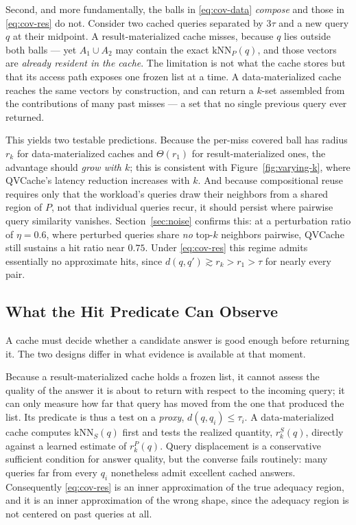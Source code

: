 Second, and more fundamentally, the balls in \eqref{eq:cov-data}
\emph{compose} and those in \eqref{eq:cov-res} do not. Consider two
cached queries separated by $3\tau$ and a new query $q$ at their
midpoint. A result-materialized cache misses, because $q$ lies outside
both balls --- yet $A_1 \cup A_2$ may contain the exact
$\mathrm{kNN}_P(q)$, and those vectors are \emph{already resident in the
cache}. The limitation is not what the cache stores but that its access
path exposes one frozen list at a time. A data-materialized cache
reaches the same vectors by construction, and can return a $k$-set
assembled from the contributions of many past misses --- a set that no
single previous query ever returned.

This yields two testable predictions. Because the per-miss covered ball
has radius $r_k$ for data-materialized caches and $\Theta(r_1)$ for
result-materialized ones, the advantage should \emph{grow with $k$};
this is consistent with Figure~\ref{fig:varying-k}, where QVCache's
latency reduction increases with $k$. And because compositional reuse
requires only that the workload's queries draw their neighbors from a
shared region of $P$, not that individual queries recur, it should
persist where pairwise query similarity vanishes. Section~\ref{sec:noise}
confirms this: at a perturbation ratio of $\eta = 0.6$, where perturbed
queries share \emph{no} top-$k$ neighbors pairwise, QVCache still
sustains a hit ratio near $0.75$. Under \eqref{eq:cov-res} this regime
admits essentially no approximate hits, since
$d(q,q') \gtrsim r_k > r_1 > \tau$ for nearly every pair.

\subsection{What the Hit Predicate Can Observe}
\label{sec:ds-predicate}

A cache must decide whether a candidate answer is good enough before
returning it. The two designs differ in what evidence is available at
that moment.

Because a result-materialized cache holds a frozen list, it cannot
assess the quality of the answer it is about to return with respect to
the incoming query; it can only measure how far that query has moved
from the one that produced the list. Its predicate is thus a test on a
\emph{proxy}, $d(q,q_i) \le \tau_i$. A data-materialized cache computes
$\mathrm{kNN}_S(q)$ first and tests the realized quantity,
$r^{S}_k(q)$, directly against a learned estimate of $r^{P}_k(q)$. Query
displacement is a conservative sufficient condition for answer quality,
but the converse fails routinely: many queries far from every $q_i$
nonetheless admit excellent cached answers. Consequently
\eqref{eq:cov-res} is an inner approximation of the true adequacy
region, and it is an inner approximation of the wrong shape, since the
adequacy region is not centered on past queries at all.

